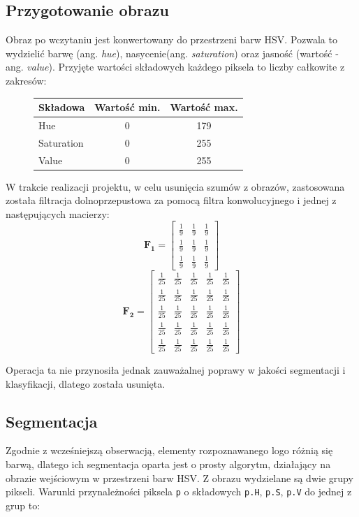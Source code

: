 \documentclass[12pt, oneside, final]{report}
\begin{document}
\subsection*{Przygotowanie obrazu}
Obraz po wczytaniu jest konwertowany do przestrzeni barw HSV. Pozwala to wydzielić barwę (ang. \textit{hue}), nasycenie(ang. \textit{saturation}) oraz jasność (wartość - ang. \textit{value}). Przyjęte wartości składowych każdego piksela to liczby całkowite z zakresów:
\begin{figure}[ht!]
	\centering
	\begin{tabular}{|l|c|c|}
		\hline
		Składowa & Wartość min. & Wartość max.\\
		\hline
		Hue & 0 & 179\\
		Saturation & 0 & 255\\
		Value & 0 & 255\\
		\hline
	\end{tabular}
\end{figure}

W trakcie realizacji projektu, w celu usunięcia szumów z obrazów, zastosowana została filtracja dolnoprzepustowa za pomocą filtra konwolucyjnego i jednej z następujących macierzy:
$$ 
\mathbf{F_1} = 
\left[\begin{matrix}
\frac{1}{9} & \frac{1}{9} & \frac{1}{9}\\
\frac{1}{9} & \frac{1}{9} & \frac{1}{9}\\
\frac{1}{9} & \frac{1}{9} & \frac{1}{9}
\end{matrix}\right]
$$
$$
\mathbf{F_2} = 
\left[\begin{matrix}
\frac{1}{25} & \frac{1}{25} & \frac{1}{25} & \frac{1}{25} & \frac{1}{25}\\
\frac{1}{25} & \frac{1}{25} & \frac{1}{25} & \frac{1}{25} & \frac{1}{25}\\
\frac{1}{25} & \frac{1}{25} & \frac{1}{25} & \frac{1}{25} & \frac{1}{25}\\
\frac{1}{25} & \frac{1}{25} & \frac{1}{25} & \frac{1}{25} & \frac{1}{25}\\
\frac{1}{25} & \frac{1}{25} & \frac{1}{25} & \frac{1}{25} & \frac{1}{25}
\end{matrix}\right]
$$

Operacja ta nie przynosiła jednak zauważalnej poprawy w jakości segmentacji i klasyfikacji, dlatego została usunięta.

\subsection*{Segmentacja}
Zgodnie z wcześniejszą obserwacją, elementy rozpoznawanego logo różnią się barwą, dlatego ich segmentacja oparta jest o prosty algorytm, działający na obrazie wejściowym w przestrzeni barw HSV. Z obrazu wydzielane są dwie grupy pikseli. Warunki przynależności piksela \texttt{p} o składowych \texttt{p.H}, \texttt{p.S}, \texttt{p.V} do jednej z grup to:
\end{document}
